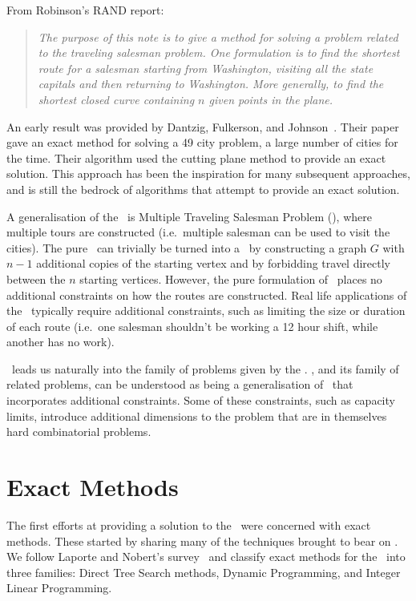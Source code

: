 From Robinson's RAND report:
   \begin{quote}
   \itshape
   The purpose of this note is to give a method for solving a problem related to the traveling salesman problem. One formulation is to find the shortest route for a salesman starting from Washington, visiting all the state capitals and then returning to Washington. More generally, to find the shortest closed curve containing $n$ given points in the plane.
   \end{quote}

An early result was provided by Dantzig, Fulkerson, and  Johnson~\cite{Dantzig:1954}. Their paper gave an exact method for solving a 49 city problem, a large number of cities for the time. Their algorithm used the cutting plane method to provide an exact solution. This approach has been the inspiration for many subsequent approaches, and is still the bedrock of algorithms that attempt to provide an exact solution.  

A generalisation of the \TSP\ is Multiple Traveling Salesman Problem (\MTSP), where multiple tours are constructed (i.e.~multiple salesman can be used to visit the cities). The pure \MTSP\ can trivially be turned into a \TSP\ by constructing a graph $G$ with $n - 1$ additional copies of the starting vertex and by forbidding travel directly between the $n$ starting vertices. However, the pure formulation of \MTSP\ places no additional constraints on how the routes are constructed. Real life applications of the \MTSP\ typically require additional constraints, such as limiting the size or duration of each route (i.e.~one salesman shouldn't be working a 12 hour shift, while another has no work).

\MTSP\ leads us naturally into the family of problems given by the \VRP. \VRP, and its family of related problems, can be understood as being a generalisation of \MTSP\ that incorporates additional constraints. Some of these constraints, such as capacity limits, introduce additional dimensions to the problem that are in themselves hard combinatorial problems.

\section{Exact Methods}
\label{sec:em}

The first efforts at providing a solution to the \VRP\ were concerned with exact methods. These started by sharing many of the techniques brought to bear on \TSP. We follow Laporte and Nobert's survey~\cite{LANO:87} and classify exact methods for the \VRP\ into three families: Direct Tree Search methods, Dynamic Programming, and Integer Linear Programming.

